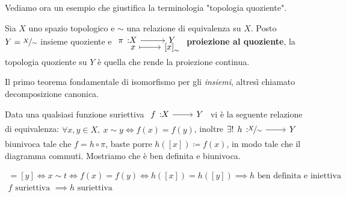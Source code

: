 Vediamo ora un esempio che giustifica la terminologia "topologia quoziente".
\begin{example}
	Sia $X$ uno spazio topologico e $\sim$ una relazione di equivalenza su $X$. Posto $Y=\nicefrac{X}{\sim}$ insieme quoziente e $\funztot \pi X Y x {\left[x\right]_\sim}$ \textbf{proiezione al quoziente}, la topologia quoziente su $Y$ è quella che rende la proiezione continua.
\end{example}

\begin{remember}
	Il primo teorema fondamentale di isomorfismo per gli \textit{insiemi}, altresì chiamato decomposizione canonica.\newline
	\begin{minipage}[t]{0.83\textwidth}
		Data una qualsiasi funzione suriettiva $\funz f X Y$ vi è la seguente relazione di equivalenza: $\displaystyle \forall x,y\in X, \ x\sim y \iff f(x)=f(y)$, inoltre $\exists ! \funz h {\nicefrac{X}{\sim}} Y$ biunivoca tale che $f=h\circ\pi$, baste porre $h\left( [x] \right) \coloneqq f(x)$, in modo tale che il diagramma commuti. Mostriamo che è ben definita e biunivoca.
	\end{minipage}
	\begin{minipage}[t]{0.13\textwidth}\vspace{-10pt}
	\end{minipage}
	\begin{gather*}
		[x]=[y]\iff x\sim t\iff f(x)=f(y)\iff h([x])=h([y]) \implies h \text{ ben definita e iniettiva }\\
		f \text{ suriettiva } \implies h \text{ suriettiva}
	\end{gather*}
\end{remember}


